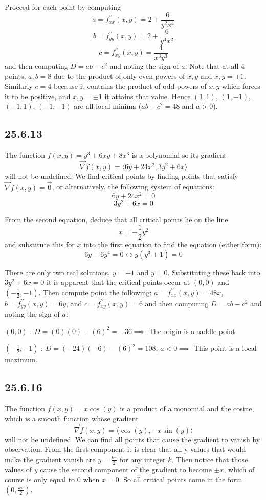 \documentclass{article}
\begin{document}
Proceed for each point by computing
$$a = f^{\prime \prime}_{xx}(x,y) = 2+\frac{6}{y^2x^4}$$
$$b = f^{\prime \prime}_{yy}(x,y) = 2+\frac{6}{y^4x^2}$$
$$c = f^{\prime \prime}_{xy}(x,y) = \frac{4}{x^3y^3}$$
and then computing $D = ab-c^2$ and noting the sign of $a$. Note that at all 4 points, $a,b=8$ due to the product of only even powers of $x,y$ and $x,y = \pm 1$. Similarly $c=4$ because it contains the product of odd powers of $x,y$ which forces it to be positive, and $x,y = \pm 1$ it attains that value. Hence $(1,1)$, $(1,-1)$, $(-1,1)$, $(-1,-1)$ are all local minima ($ab-c^2 = 48$ and $a>0$).

\subsection{25.6.13}

The function $f(x,y) = y^3 + 6xy + 8x^3$ is a polynomial so its gradient $$\vec{\nabla}f(x,y) = \langle 6y + 24x^2, 3y^2 + 6x \rangle$$ will not be undefined. We find critical points by finding points that satisfy $\vec{\nabla}f(x,y) = \vec{0}$, or alternatively, the following system of equations:
$$6y + 24x^2 = 0$$
$$3y^2 + 6x = 0$$

From the second equation, deduce that all critical points lie on the line $$x = -\frac{1}{2}y^2$$ and substitute this for $x$ into the first equation to find the equation (either form): $$6y + 6y^4 = 0 \leftrightarrow y(y^3 + 1) = 0$$

There are only two real solutions, $y = -1$ and $y = 0$. Substituting these back into $3y^2 + 6x = 0$ it is apparent that the critical points occur at $(0,0)$ and $(-\frac{1}{2}, -1)$. Then compute point the following: $a = f^{\prime \prime}_{xx}(x,y) = 48x$, $b = f^{\prime \prime}_{yy}(x,y) = 6y$, and $c = f^{\prime \prime}_{xy}(x,y) = 6$ and then computing $D = ab-c^2$ and noting the sign of $a$:

$(0,0)$ : $D = (0)(0)-(6)^2 = -36 \implies$ The origin is a saddle point.

$(-\frac{1}{2}, -1)$ : $D = (-24)(-6)-(6)^2 = 108$, $a < 0 \implies$ This point is a local maximum.

\subsection{25.6.16}

The function $f(x,y) = x\cos(y)$ is a product of a monomial and the cosine, which is a smooth function whose gradient $$\vec{\nabla}f(x,y) = \langle \cos(y),-x\sin(y) \rangle$$ will not be undefined. We can find all points that cause the gradient to vanish by observation. From the first component it is clear that all y values that would make the gradient vanish are $y = \frac{k\pi}{2}$ for any integer $k$. Then notice that those values of $y$ cause the second component of the gradient to become $\pm x$, which of course is only equal to $0$ when $x=0$. So all critical points come in the form $(0, \frac{k\pi}{2})$.
\end{document}
